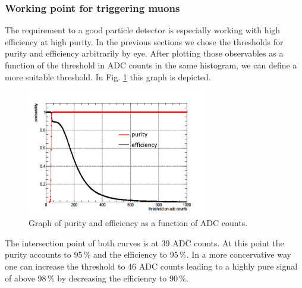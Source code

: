 		\subsubsection{Working point for triggering muons}
		\label{working_point}
			The requirement to a good particle detector is especially working with high efficiency at high purity.
			In the previous sections we chose the thresholds for purity and efficiency arbitrarily by eye.
			After plotting those observables as a function of the threshold in ADC counts in the same histogram, we can define a more suitable threshold.
			In Fig. \ref{fig:pur_eff} this graph is depicted.
			\begin{figure}[htbp]
				\centering
				\includegraphics[width=0.70\textwidth]{Figures/erdogan/pur_eff.png}
				\caption{Graph of purity and efficiency as a function of ADC counts.}
				\label{fig:pur_eff}
			\end{figure}
			The intersection point of both curves is at 39 ADC counts.
			At this point the purity accounts to 95\,\% and the efficiency to 95\,\%.
			In a more concervative way one can increase the threshold to 46 ADC counts leading to a highly pure signal of above 98\,\% by decreasing the efficiency to 90\,\%.